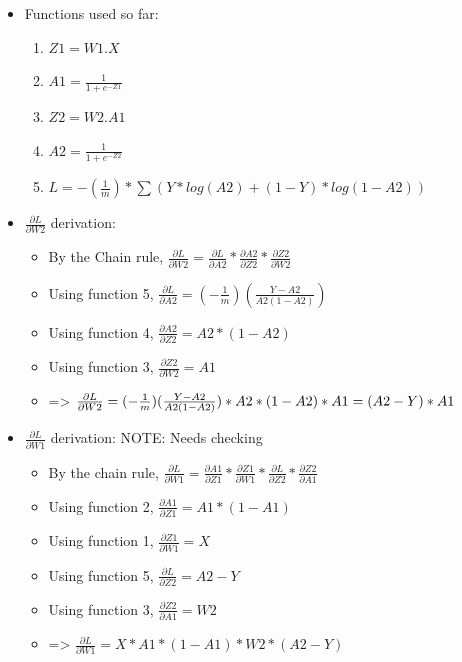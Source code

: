 \documentclass[10pt,a4paper]{article}
\begin{document}
\begin{itemize}
    \item Functions used so far:
    \begin{enumerate}
        \item $Z1 = W1 . X$
        \item $A1 = \frac{1}{1+e^{-Z1}}$
        \item $Z2 = W2 . A1$
        \item $A2 = \frac{1}{1+e^{-Z2}}$
        \item $L = -(\frac{1}{m}) * \sum(Y * log(A2) + (1-Y) * log(1-A2))$
    \end{enumerate}
    \item $\frac{\partial{L}}{\partial{W2}}$ derivation:
    \begin{itemize}
        \item By the Chain rule, $\frac{\partial{L}}{\partial{W2}} = \frac{\partial{L}}{\partial{A2}} * \frac{\partial{A2}}{\partial{Z2}} * \frac{\partial{Z2}}{\partial{W2}}$
        \item Using function 5, $\frac{\partial{L}}{\partial{A2}} = (-\frac{1}{m})(\frac{Y-A2}{A2(1-A2)})$
        \item Using function 4, $\frac{\partial{A2}}{\partial{Z2}} = A2 * (1-A2)$
        \item Using function 3, $\frac{\partial{Z2}}{\partial{W2}} = A1$
        \item => $\frac{\partial{L}}{\partial{W2}} = (-\frac{1}{m})(\frac{Y-A2}{A2(1-A2)}) * A2 * (1-A2) * A1\\
              = (A2-Y) * A1$
    \end{itemize}
    \item $\frac{\partial{L}}{\partial{W1}}$ derivation: NOTE: Needs checking
    \begin{itemize}
        \item By the chain rule, $\frac{\partial{L}}{\partial{W1}} = \frac{\partial{A1}}{\partial{Z1}} * \frac{\partial{Z1}}{\partial{W1}} * \frac{\partial{L}}{\partial{Z2}} * \frac{\partial{Z2}}{\partial{A1}}$
        \item Using function 2, $\frac{\partial{A1}}{\partial{Z1}} = A1 * (1-A1)$
        \item Using function 1, $\frac{\partial{Z1}}{\partial{W1}} = X$
        \item Using function 5, $\frac{\partial{L}}{\partial{Z2}} = A2 - Y$
        \item Using function 3, $\frac{\partial{Z2}}{\partial{A1}} = W2$
        \item => $\frac{\partial{L}}{\partial{W1}} = X * A1 * (1-A1) * W2 * (A2-Y)$
    \end{itemize}
\end{itemize}
\end{document}
